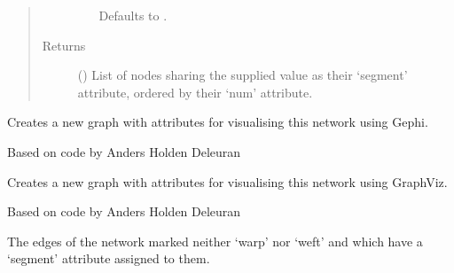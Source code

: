 \documentclass[letterpaper,10pt,english]{sphinxmanual}
\begin{document}
\begin{fulllineitems}
\begin{fulllineitems}
\begin{quote}
\begin{description}
\begin{itemize}
Defaults to .


\end{itemize}

\item[{Returns}] \leavevmode
{} () \textendash{} List of nodes sharing the supplied value as their ‘segment’
attribute, ordered by their ‘num’ attribute.

\end{description}\end{quote}

\end{fulllineitems}


\begin{fulllineitems}
\label{\detokenize{cockatoo:cockatoo.KnitNetworkBase.prepare_for_gephi}}
Creates a new graph with attributes for visualising this network
using Gephi.

Based on code by Anders Holden Deleuran

\end{fulllineitems}


\begin{fulllineitems}
\label{\detokenize{cockatoo:cockatoo.KnitNetworkBase.prepare_for_graphviz}}
Creates a new graph with attributes for visualising this network
using GraphViz.

Based on code by Anders Holden Deleuran

\end{fulllineitems}


\begin{fulllineitems}
\label{\detokenize{cockatoo:cockatoo.KnitNetworkBase.segment_contour_edges}}
The edges of the network marked neither ‘warp’ nor ‘weft’ and which have a ‘segment’ attribute assigned to them.


\end{fulllineitems}
\end{fulllineitems}
\end{document}
